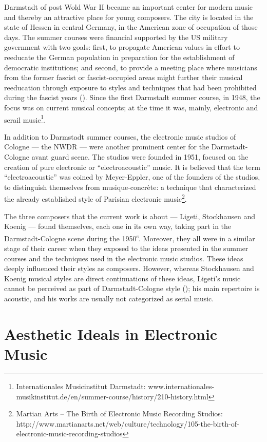\documentclass[a4paper,11pt]{article}
\begin{document}
Darmstadt of post Wold War II became an important center for modern music and thereby an attractive place for young composers.
The city is located in the state of Hessen in central Germany, in the American zone of occupation of those days.
The summer courses were financial supported by the US military government with two goals:
first, to propagate American values in effort to reeducate the German population in preparation for the establishment of democratic institutions;
and second, to provide a meeting place where musicians from the former fascist or fascist-occupied areas might further their musical reeducation through exposure to styles and techniques that had been prohibited during the fascist years (\cite{darmstadt_oxford}).
Since the first Darmstadt summer course, in 1948, the focus was on current musical concepts;
at the time it was, mainly, electronic and serail music\footnote{Internationales Musicinstitut Darmstadt: www.internationales-musikinstitut.de/en/summer-course/history/210-history.html}.

In addition to Darmstadt summer courses, the electronic music studios of Cologne --- the NWDR --- were another prominent center for the Darmstadt-Cologne avant guard scene.
The studios were founded in 1951, focused on the creation of pure electronic or ``electroacoustic'' music.
It is believed that the term ``electroacoustic'' was coined by Meyer-Eppler, one of the founders of the studios, to distinguish themselves from musique-concr{\`e}te:
a technique that characterized the already established style of Parisian electronic music\footnote{Martian Arts -- The Birth of Electronic Music Recording Studios: http://www.martianarts.net/web/culture/technology/105-the-birth-of-electronic-music-recording-studios}.

The three composers that the current work is about --- Ligeti, Stockhausen and Koenig --- found themselves, each one in its own way, taking part in the Darmstadt-Cologne scene during the 1950\textsuperscript{s}.
Moreover, they all were in a similar stage of their career when they exposed to the ideas presented in the summer courses and the techniques used in the electronic music studios.
These ideas deeply influenced their styles as composers.
However, whereas Stockhausen and Koenig musical styles are direct continuations of these ideas, Ligeti's music cannot be perceived as part of Darmstadt-Cologne style (\cite{levy2006});
his main repertoire is acoustic, and his works are usually not categorized as serial music.

\section{Aesthetic Ideals in Electronic Music}
\label{sec:aesthetic_ideals_in_electronic_music}
\end{document}
